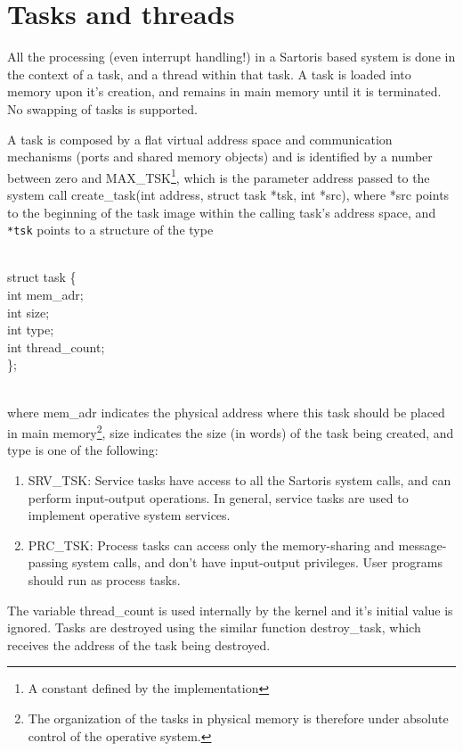 \documentclass[11pt, letterpaper, twoside, english]{book}
\begin{document}
\section{Tasks and threads}
All the processing (even interrupt handling!) in a Sartoris based system is done in the context of a task, and a thread within that task. A task is loaded into memory upon it's creation, and remains in main memory until it is terminated. No swapping of tasks is supported.

A task is composed by a flat virtual address space and communication mechanisms (ports and shared memory objects) and is identified by a number between zero and \textsf{MAX\_TSK}\footnote{A constant defined by the implementation}, which is the parameter \textsf{address} passed to the system call \textsf{create\_task(int address, struct task *tsk, int *src)}, where \textsf{*src} points to the beginning of the task image within the calling task's address space, and \verb|*tsk| points to a structure of the type \\
\\
\begin{sf}
\noindent struct task \{ \\
\indent  int mem\_adr; \\
\indent  int size; \\
\indent  int type; \\
\indent  int thread\_count; \\
\}; \\
\end{sf}
\\
\noindent where \textsf{mem\_adr} indicates the physical address where this task should be placed in main memory\footnote{The organization of the tasks in physical memory is therefore under absolute control of the operative system.}, \textsf{size} indicates the size (in words) of the task being created, and \textsf{type} is one of the following:
\begin{enumerate}
\item[] \textsf{SRV\_TSK}: Service tasks have access to all the Sartoris system calls, and can perform input-output operations. In general, service tasks are used to implement operative system services.
\item[] \textsf{PRC\_TSK}: Process tasks can access only the memory-sharing and message-passing system calls, and don't have input-output privileges. User programs should run as process tasks.
\end{enumerate}
The variable \textsf{thread\_count} is used internally by the kernel and it's initial value is ignored.
Tasks are destroyed using the similar function \textsf{destroy\_task}, which receives the address of the task being destroyed.
\end{document}
